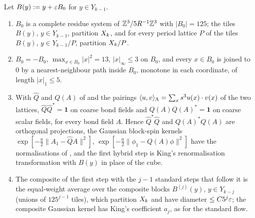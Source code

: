 \begin{lemma}\label{rot:lem:tile}
Let $B(y):= y+\varepsilon B_0$ for $y\in Y_{k-1}$.
\begin{enumerate}[label=\textup{(\roman*)},leftmargin=*]
\item $B_0$ is a complete residue system of $\mathbb Z^3/5R^{-1}\mathbb Z^3$ with $|B_0|=125$; the tiles $B(y)$, $y\in Y_{k-1}$, partition $X_k$, and for every period lattice $P$ of  the tiles $B(y)$, $y\in Y_{k-1}/P$, partition $X_k/P$.
\item $B_0=-B_0$, $\max_{x\in B_0}|x|^2=13$, $|x|_\infty\le3$ on $B_0$, and every $x\in B_0$ is joined to $0$ by a nearest-neighbour path inside $B_0$, monotone in each coordinate, of length $|x|_1\le5$.
\item With $\hat Q$ and $Q(A)$ of  and the pairings $\langle u,v\rangle_\Lambda=\sum_xs^3u(x)\cdot v(x)$ of the two lattices, $\hat Q\hat Q^*=\mathbf 1$ on coarse bond fields and $Q(A)Q(A)^*=\mathbf 1$ on coarse scalar fields, for every bond field $A$. Hence $\hat Q^*\hat Q$ and $Q(A)^*Q(A)$ are orthogonal projections, the Gaussian block-spin kernels $\exp[-\frac a2\|A_1-\hat QA\|^2]$, $\exp[-\frac a2\|\phi_1-Q(A)\phi\|^2]$ have the normalisations of \cite[(2.10)--(2.14)]{K1}, and the first hybrid step is King's renormalisation transformation with $B(y)$ in place of the cube.
\item The composite of the first step with the $j-1$ standard steps that follow it is the equal-weight average over the composite blocks $B^{(j)}(y)$, $y\in Y_{k-j}$ (unions of $125^{j-1}$ tiles), which partition $X_k$ and have diameter $\le C5^j\varepsilon$; the composite Gaussian kernel has King's coefficient $a_j$, as for the standard flow.
\end{enumerate}
\end{lemma}
